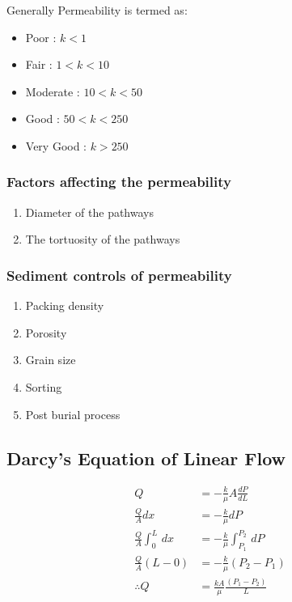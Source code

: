 \documentclass{article}
\begin{document}
    \begin{multicols}{2}
        Generally Permeability is termed as: 
        \begin{itemize}
            \item Poor : $k < 1$
            \item Fair : $1< k < 10$
            \item Moderate : $10< k < 50$
            \item Good : $50< k < 250$
            \item Very Good : $ k > 250$
        \end{itemize}
    
        \subsubsection*{Factors affecting the permeability}
        \begin{enumerate}
            \item Diameter of the pathways 
            \item The tortuosity of the pathways 
        \end{enumerate}
    
        \subsubsection*{Sediment controls of permeability}
        \begin{enumerate}
            \item Packing density  
            \item Porosity 
            \item Grain size 
            \item Sorting 
            \item Post burial process 
        \end{enumerate}

        \vspace*{0.5cm}
    \end{multicols}

    \subsection*{Darcy's Equation of Linear Flow}
    \begin{align*}
        Q &= - \frac{k}{\mu} A \frac{dP}{dL} \\
        \frac{Q}{A} dx &= -\frac{k}{\mu} dP \\
        \frac{Q}{A} \int_{0}^{L} \, dx &= -\frac{k}{\mu} \int_{P_1}^{P_2} \, dP \\
        \frac{Q}{A} (L-0) &= - \frac{k}{\mu} (P_2 - P_1) \\
        \therefore Q &= \frac{kA}{\mu} \frac{(P_1-P_2)}{L}
    \end{align*}
\end{document}
